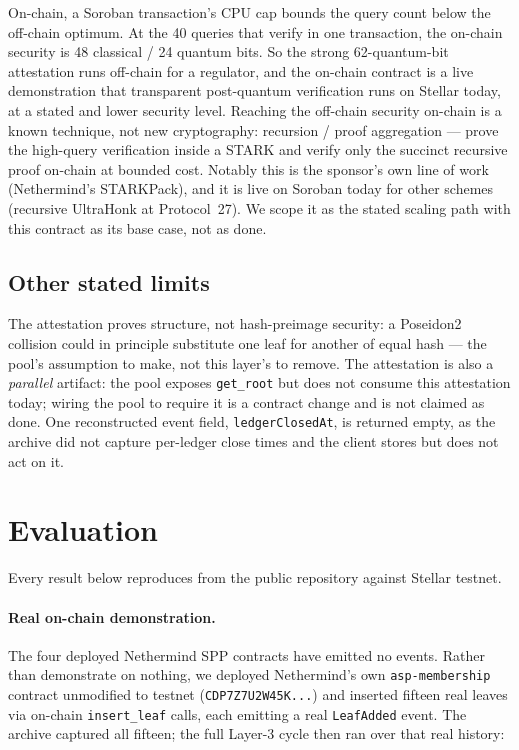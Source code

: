 \documentclass[11pt]{article}
\newcommand{\code}[1]{\texttt{\small #1}}
\begin{document}
On-chain, a Soroban transaction's CPU cap bounds the query count below the
off-chain optimum. At the 40 queries that verify in one transaction, the
on-chain security is 48 classical / 24 quantum bits. So the strong 62-quantum-bit
attestation runs off-chain for a regulator, and the on-chain contract is a live
demonstration that transparent post-quantum verification runs on Stellar today,
at a stated and lower security level. Reaching the off-chain security on-chain is
a known technique, not new cryptography: recursion / proof aggregation --- prove
the high-query verification inside a STARK and verify only the succinct recursive
proof on-chain at bounded cost. Notably this is the sponsor's own line of work
(Nethermind's STARKPack), and it is live on Soroban today for other schemes
(recursive UltraHonk at Protocol~27). We scope it as the stated scaling path with
this contract as its base case, not as done.

\subsection{Other stated limits}

The attestation proves structure, not hash-preimage security: a Poseidon2
collision could in principle substitute one leaf for another of equal hash --- the
pool's assumption to make, not this layer's to remove. The attestation is also a
\emph{parallel} artifact: the pool exposes \code{get\_root} but does not consume
this attestation today; wiring the pool to require it is a contract change and is
not claimed as done. One reconstructed event field, \code{ledgerClosedAt}, is
returned empty, as the archive did not capture per-ledger close times and the
client stores but does not act on it.

\section{Evaluation}

Every result below reproduces from the public repository against Stellar testnet.

\paragraph{Real on-chain demonstration.} The four deployed Nethermind SPP
contracts have emitted no events. Rather than demonstrate on nothing, we deployed
Nethermind's own \code{asp-membership} contract unmodified to testnet
(\code{CDP7Z7U2W45K...}) and inserted fifteen real leaves via on-chain
\code{insert\_leaf} calls, each emitting a real \code{LeafAdded} event. The
archive captured all fifteen; the full Layer-3 cycle then ran over that real
history:
\end{document}
